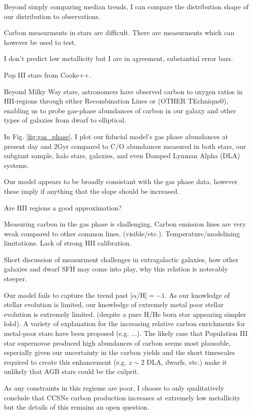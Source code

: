\documentclass[12pt,oneside]{report}
\begin{document}
Beyond simply comparing median trends, I can compare the distribution 
shape of our distribution to observations. 

Carbon measurments in stars are difficult. There are measurments which can however be used to test. 

I don't predict low metallicity but I are in agreement, substantial error bars.

Pop III stars from Cooke++. 

Beyond Milky Way stars, astronomers have observed carbon to oxygen ratios in
HII-regions through either Recombination Lines or (OTHER TEchnique0), enabling
us to probe gas-phase abundances of carbon in our galaxy and other types of
galaxies from dwarf to elliptical. 

In Fig. \ref{fig:gas_phase}, I plot our fiducial model's gas phase abundances
at present day and 2Gyr compared to C/O
abundances measured in both stars, our subgiant sample, halo stars, galaxies,
and even Damped Lynman Alpha (DLA) systems. 

Our model appears to be broadly consistant with the gas phase data, however these imply if anything that the slope should be increased. 

Are HII regions a good approximation?

Measuring carbon in the gas phase is challenging. Carbon emission lines are
very weak compared to other common lines, (visible/etc.).
Temperature/modelining limitations. Lack of strong HII calibration. 

Short discussion of measurment challenges in extragalactic galaxies, how other galaxies and dwarf SFH may come into play, why this relation is notecably steeper.

Our model fails to capture the trend past [$\alpha$/H]$=-1$. As our knowledge
of stellar evolution is limited, our knowledge of extremely metal poor stellar
evolution is extremely limited. (despite a pure H/He born star appearing
simpler lolol). A variety of explanation for the increasing relative carbon
enrichments for metal-poor stars have been proposed (e.g. ...). The likely case
that Population III star supernovae produced high abundances of carbon seems
most plausable, especially given our uncertainty in the carbon yields and the
short timescales required to create this enhancement (e.g. $z\sim 2$ DLA,
dwarfs, etc.) make it unlikely that AGB stars could be the culprit. 

As any constraints in this regieme are poor, I choose to only qualitatively
conclude that CCSNe carbon production increases at extremely low metallicity
but the details of this remains an open question.
\end{document}

